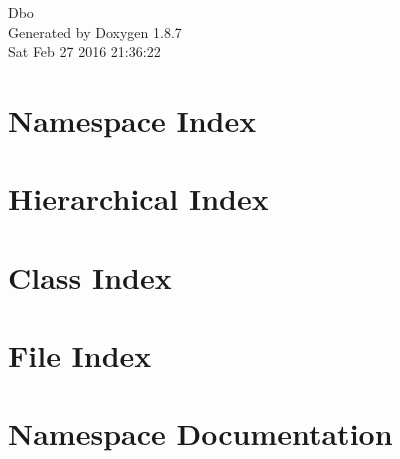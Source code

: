 \documentclass[twoside]{book}
\newcommand{\+}{\discretionary{\mbox{\scriptsize$\hookleftarrow$}}{}{}}
\newcommand{\clearemptydoublepage}{%
  \newpage{\pagestyle{empty}\cleardoublepage}%
}
\begin{document}
\hypersetup{pageanchor=false,
             bookmarks=true,
             bookmarksnumbered=true,
             pdfencoding=unicode
            }
\begin{titlepage}
\vspace*{7cm}
\begin{center}%
{\Large Dbo }\\
\vspace*{1cm}
{\large Generated by Doxygen 1.8.7}\\
\vspace*{0.5cm}
{\small Sat Feb 27 2016 21:36:22}\\
\end{center}
\end{titlepage}
\clearemptydoublepage
\tableofcontents
\clearemptydoublepage
{}
\hypersetup{pageanchor=true}

\chapter{Namespace Index}

\chapter{Hierarchical Index}

\chapter{Class Index}

\chapter{File Index}

\chapter{Namespace Documentation}







\end{document}
